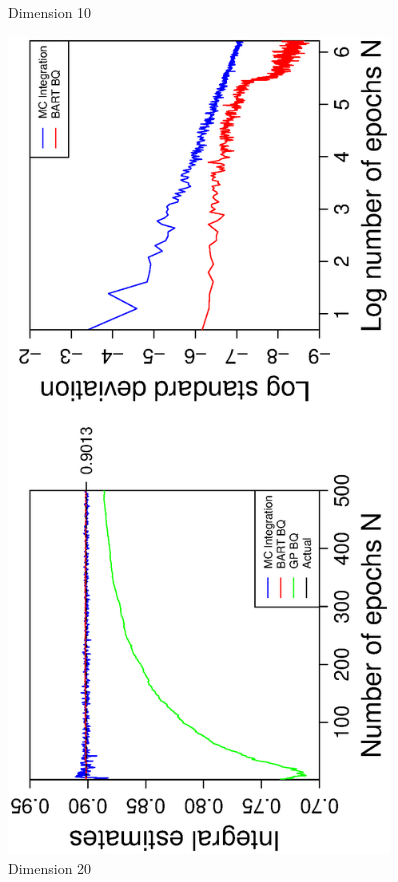 \begin{figure}[H]
\begin{minipage}[b]{0.4\textwidth}
     \vspace{-1cm}
     \caption{Dimension 10}
  \end{minipage}
    \hspace{1.5cm}
  \begin{minipage}[b]{0.4\textwidth}
    \includegraphics[width= 0.9\textwidth, angle = -90]{report/Figures/4/convergenceMean420Dimensions.eps}
    \vspace{-1cm}
    \caption{Dimension 20}
  \end{minipage}
\end{figure}


